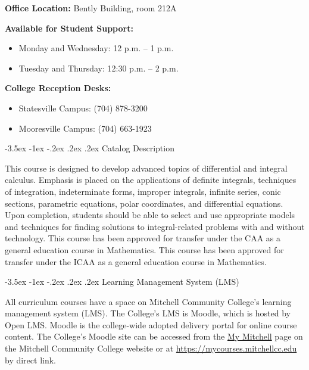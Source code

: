 \documentclass[11pt]{article}
\makeatletter
\renewcommand\section{\@startsection{section}{1}{0pt}%
  {-3.5ex \@plus -1ex \@minus -.2ex}%
  {.2ex \@plus.2ex}%
  {\normalfont\Large\bfseries}} %
\makeatother
\begin{document}
\textbf{Office Location:} Bently Building, room 212A

\textbf{Available for Student Support:}

\begin{itemize}
\item Monday and Wednesday: 12 p.m. -- 1 p.m.
\item Tuesday and Thursday: 12:30 p.m. -- 2 p.m.
\end{itemize}

\textbf{College Reception Desks:}

\begin{itemize}
\item Statesville Campus: (704) 878-3200
\item Mooresville Campus: (704) 663-1923
\end{itemize}

\section{Catalog Description}

This course is designed to develop advanced topics of differential and integral calculus. Emphasis is placed on the applications of definite integrals, techniques of integration, indeterminate forms, improper integrals, infinite series, conic sections, parametric equations, polar coordinates, and differential equations. Upon completion, students should be able to select and use appropriate models and techniques for finding solutions to integral-related problems with and without technology. This course has been approved for transfer under the CAA as a general education course in Mathematics. This course has been approved for transfer under the ICAA as a general education course in Mathematics.

\section{Learning Management System (LMS)}

All curriculum courses have a space on Mitchell Community College's learning management system (LMS). The College's LMS is Moodle, which is hosted by Open LMS. Moodle is the college-wide adopted delivery portal for online course content. The College's Moodle site can be accessed from the \href{https://mitchellcc.edu/my-mitchell}{My Mitchell} page on the Mitchell Community College website or at \href{https://mycourses.mitchellcc.edu}{https://mycourses.mitchellcc.edu} by direct link.
\end{document}
